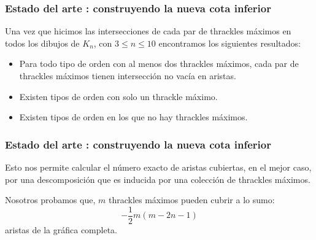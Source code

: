 \begin{frame}
\frametitle{Estado del arte : construyendo la nueva cota inferior}
Una vez que hicimos las intersecciones de cada par de thrackles máximos en todos los dibujos de $K_n$, con $3 \leq n \leq 10$ encontramos los siguientes resultados:
\begin{itemize}
	\item Para todo tipo de orden con al menos dos thrackles máximos, cada par de thrackles máximos tienen intersección no vacía en aristas.
	\item Existen tipos de orden con solo un thrackle máximo.
	\item Existen tipos de orden en los que no hay thrackles máximos.
\end{itemize}
\end{frame}

\begin{frame}
\frametitle{Estado del arte : construyendo la nueva cota inferior}
Esto nos permite calcular el número exacto de aristas cubiertas, en el mejor caso, por una descomposición que es inducida por una colección de thrackles máximos. 

Nosotros probamos que, $m$ thrackles máximos pueden cubrir a lo sumo:
\[
-\frac{1}{2}m(m-2n-1)
\] aristas de la gráfica completa.
\pause 

\begin{table}
	\centering
{}
\end{table}
\end{frame}

